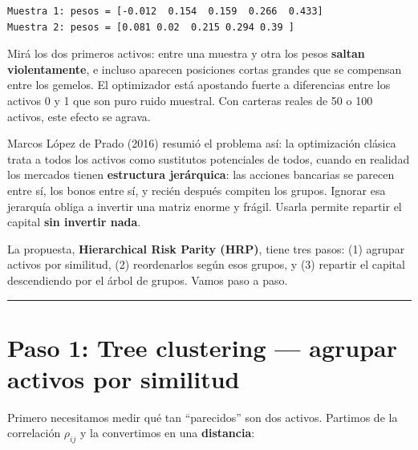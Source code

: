\documentclass[
  spanish,
  letterpaper,
  DIV=11,
  numbers=noendperiod]{scrreprt}
\begin{document}
\begin{verbatim}
Muestra 1: pesos = [-0.012  0.154  0.159  0.266  0.433]
Muestra 2: pesos = [0.081 0.02  0.215 0.294 0.39 ]
\end{verbatim}

Mirá los dos primeros activos: entre una muestra y otra los pesos
\textbf{saltan violentamente}, e incluso aparecen posiciones cortas
grandes que se compensan entre los gemelos. El optimizador está
apostando fuerte a diferencias entre los activos 0 y 1 que son puro
ruido muestral. Con carteras reales de 50 o 100 activos, este efecto se
agrava.

\begin{tcolorbox}[enhanced jigsaw, bottomrule=.15mm, colback=white, opacitybacktitle=0.6, arc=.35mm, toprule=.15mm, opacityback=0, breakable, titlerule=0mm, left=2mm, coltitle=black, colbacktitle=quarto-callout-note-color!10!white, colframe=quarto-callout-note-color-frame, leftrule=.75mm, toptitle=1mm, bottomtitle=1mm, title=\textcolor{quarto-callout-note-color}{\faInfo}\hspace{0.5em}{El diagnóstico de López de Prado}, rightrule=.15mm]

Marcos López de Prado (2016) resumió el problema así: la optimización
clásica trata a todos los activos como sustitutos potenciales de todos,
cuando en realidad los mercados tienen \textbf{estructura jerárquica}:
las acciones bancarias se parecen entre sí, los bonos entre sí, y recién
después compiten los grupos. Ignorar esa jerarquía obliga a invertir una
matriz enorme y frágil. Usarla permite repartir el capital \textbf{sin
invertir nada}.

\end{tcolorbox}

La propuesta, \textbf{Hierarchical Risk Parity (HRP)}, tiene tres pasos:
(1) agrupar activos por similitud, (2) reordenarlos según esos grupos, y
(3) repartir el capital descendiendo por el árbol de grupos. Vamos paso
a paso.

\begin{center}\rule{0.5\linewidth}{0.5pt}\end{center}

\chapter{Paso 1: Tree clustering --- agrupar activos por
similitud}\label{paso-1-tree-clustering-agrupar-activos-por-similitud}

Primero necesitamos medir qué tan ``parecidos'' son dos activos.
Partimos de la correlación \(\rho_{ij}\) y la convertimos en una
\textbf{distancia}:
\end{document}

